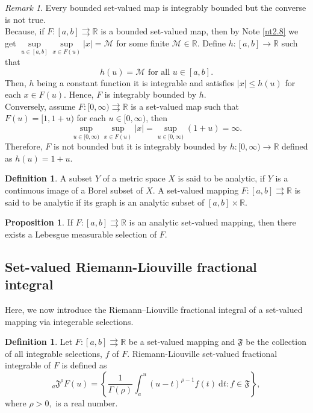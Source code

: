 \documentclass[a4paper,12pt,reqno]{amsart}
\numberwithin{equation}{section}
\theoremstyle{definition}
\newtheorem{definition}[theorem]{Definition}
\newtheorem{proposition}[theorem]{Proposition}
\theoremstyle{remark}
\newtheorem{remark}[theorem]{Remark}
\numberwithin{equation}{section}
\begin{document}
\begin{remark}
Every bounded set-valued map is integrably bounded but the converse is not true.\\
Because, if $F:[a,b]\rightrightarrows \mathbb{R}$ is a bounded set-valued map, then by Note \ref{nt2.8} we get $\underset{u\in [a,b]}{\sup}\underset{x\in F(u)}{\sup}\lvert x \rvert = \mathcal{M}$ for some finite $\mathcal{M} \in \mathbb{R}$. Define $h:[a,b]\rightarrow \mathbb{R}$ such that 
\[h(u)=\mathcal{M} \text{ for all } u\in [a,b].\]
Then, $h$ being a constant function it is integrable and satisfies $\lvert x \rvert \leq h(u)$ for each $x\in F(u).$ Hence, $F$ is integrably bounded by $h$.\\
Conversely, assume $F:[0,\infty)\rightrightarrows \mathbb{R}$ is a set-valued map such that $F(u)=[1,1+u)$ for each $u\in [0,\infty)$, then 
\[\sup_{u\in [0,\infty)}\sup_{x\in F(u)} \lvert x \rvert= \sup_{u\in [0,\infty)} (1+u)= \infty.\]
Therefore, $F$ is not bounded but it is integrably bounded by $h:[0,\infty)\rightarrow \mathbb{R}$ defined as $h(u)=1+u$.
\end{remark}

\begin{definition}\cite{CK}
A subset $Y$ of a metric space $X$ is said to be analytic, if $Y$ is a continuous image of a Borel subset of $X$.
A set-valued mapping $F:[a,b]\rightrightarrows \mathbb{R}$ is said to be analytic if its graph is an analytic subset of $[a,b]\times \mathbb{R}$.
\end{definition}

\begin{proposition}\cite{aumann1965integrals}\label{Prop1}
If $F:[a,b]\rightrightarrows \mathbb{R}$ is an analytic set-valued mapping, then there exists a Lebesgue measurable selection of $F$.
\end{proposition}

\subsection*{Set-valued Riemann-Liouville fractional integral } Here, we now introduce the Riemann–Liouville fractional integral of a set-valued mapping via integerable selections.
\begin{definition}
Let $F:[a,b]\rightrightarrows \mathbb{R}$ be a set-valued mapping and $\mathfrak{F}$ be the collection of all integrable selections, $f$ of $F$. Riemann-Liouville set-valued fractional integrable of $F$ is defined as
\[_{a}\mathfrak{J}^{\rho}F(u)=\left\{\frac{1}{\Gamma(\rho)}\int_{a}^{u}(u-t)^{\rho-1}f(t)~\mathrm{d}t : f\in \mathfrak{F}\right\},\] 
where $\rho>0,$ is a real number.
\end{definition}
\end{document}
